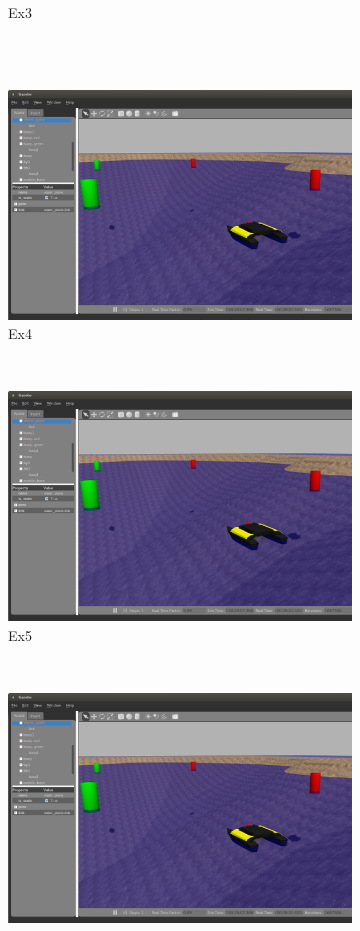 \documentclass[11pt]{article}
\begin{document}
\begin{figure}[h]
\begin{subfigure}[t]{0.3\textwidth}
    \caption{Ex3}
  \end{subfigure}\\
  ~
  \begin{subfigure}[t]{0.3\textwidth}
    \includegraphics[width=\textwidth]{example.png}
    \caption{Ex4}
  \end{subfigure}
  ~
  \begin{subfigure}[t]{0.3\textwidth}
    \includegraphics[width=\textwidth]{example.png}
    \caption{Ex5}
  \end{subfigure}
  ~
  \begin{subfigure}[t]{0.3\textwidth}
    \includegraphics[width=\textwidth]{example.png}

\end{subfigure}
\end{figure}
\end{document}
